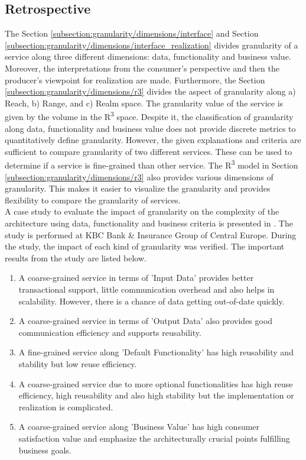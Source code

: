 \subsection{Retrospective}\label{subsection:granularity/dimensions/retrospective}
The Section \ref{subsection:granularity/dimensions/interface} and Section \ref{subsection:granularity/dimensions/interface_realization} divides granularity of a service along three different dimensions: data, functionality and business value. Moreover, the interpretations from the consumer's perspective and then the producer's viewpoint for realization are made.
Furthermore, the Section \ref{subsection:granularity/dimensions/r3} divides the aspect of granularity along a) Reach, b) Range, and c) Realm space. The granularity value of the service is given by the volume in the R\textsuperscript{3} space.
Despite it, the classification of granularity along data, functionality and business value does not provide discrete metrics to quantitatively define granularity. However, the given explanations and criteria are sufficient to compare granularity of two different services. These can be used to determine if a service is fine-grained than other service.
The R\textsuperscript{3} model in Section \ref{subsection:granularity/dimensions/r3} also provides various dimensions of granularity. This makes it easier to visualize the granularity and provides flexibility to compare the granularity of services.
\\
A case study to evaluate the impact of granularity on the complexity of the architecture using data, functionality and business criteria is presented in \cite{Pierre-Reldin:2007aa}. The study is performed at KBC Bank & Insurance Group of Central Europe. During the study, the impact of each kind of granularity was verified. The important results from the study are listed below.

\begin{enumerate}
\item A coarse-grained service in terms of 'Input Data' provides better transactional support, little communication overhead and also helps in scalability. However, there is a chance of data getting out-of-date quickly.
\item A coarse-grained service in terms of 'Output Data' also provides good communication efficiency and supports reusability.
\item A fine-grained service along 'Default Functionality' has high reusability and stability but low reuse efficiency.
\item A coarse-grained service due to more optional functionalities has high reuse efficiency, high reusability and also high stability but the implementation or realization is complicated.
\item A coarse-grained service along 'Business Value' has high consumer satisfaction value and emphasize the architecturally crucial points fulfilling business goals.
\end{enumerate}

